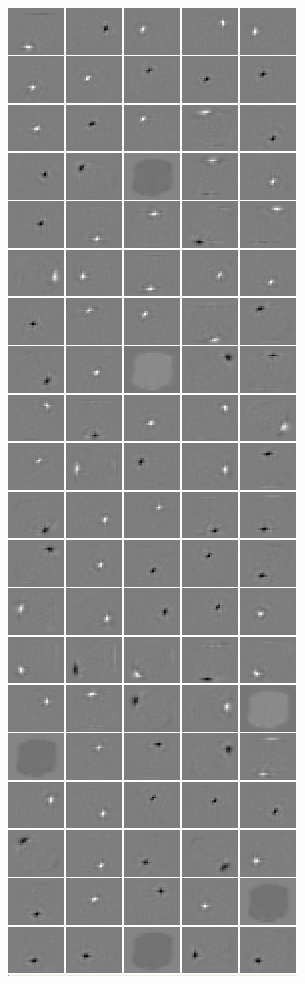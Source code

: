 {\begin{figure}
\begin{subfigure}[b]{0.225\textwidth}
\includegraphics[width=\x, height=\y]{./figures/SATAE/MNIST_sat_linear_full.png}
\caption{} \end{subfigure} \begin{subfigure}[b]{0.2\textwidth} \centering

\end{subfigure}
\end{figure}}
